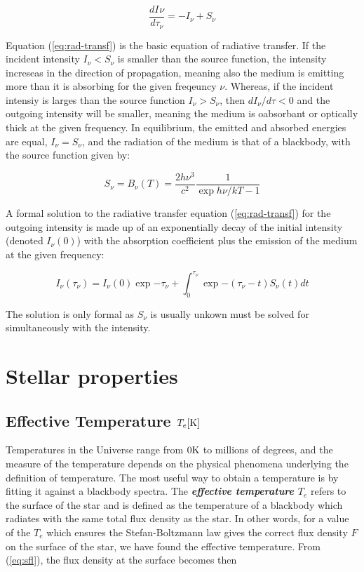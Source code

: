 \begin{equation}\label{eq:rad-transf}
	\frac{dI_{}\nu}{d\tau_{\nu}} = -I_{\nu} + S_{\nu}
\end{equation}

Equation (\ref{eq:rad-transf}) is the basic equation of radiative transfer. If the incident intensity $I_{\nu} < S_{\nu}$ is smaller than the source function, the intensity increseas in the direction of propagation, meaning also the medium is emitting more than it is absorbing for the given freqeuncy $\nu$. Whereas, if the incident intensiy is larges than the source function $I_{\nu} > S_{\nu}$, then $dI_{\nu}/d\tau < 0$ and the outgoing intensity will be smaller, meaning the medium is oabsorbant or optically thick at the given frequency. In equilibrium, the emitted and absorbed energies are equal, $I_{\nu} = S_{\nu}$, and the radiation of the medium is that of a blackbody, with the source function given by:

\begin{equation}
	S_{\nu} = B_{\nu}(T) = \frac{2h\nu^3}{c^2} \frac{1}{\exp{h\nu/kT}-1}
\end{equation}

A formal solution to the radiative transfer equation (\ref{eq:rad-transf}) for the outgoing intensity is made up of an exponentially decay of the initial intensity (denoted $I_{\nu}(0)$) with the absorption coefficient plus the emission of the medium at the given frequency:

\begin{equation}\label{eq:solution}
	I_{\nu}(\tau_{\nu}) = I_{\nu}(0)\exp{-\tau_{\nu}} + \int_0^{\tau_{\nu}} \exp{-(\tau_{\nu}-t)} S_{\nu}(t) dt
\end{equation}

The solution is only formal as $S_{\nu}$ is usually unkown must be solved for simultaneously with the intensity.

\section{Stellar properties}

\subsection{Effective Temperature $T_e [\rm{K}]$}

Temperatures in the Universe range from $\rm{0 K}$ to millions of degrees, and the measure of the temperature depends on the physical phenomena underlying the definition of temperature. The most useful way to obtain a temperature is by fitting it against a blackbody spectra. The \textbf{\textit{effective temperature $T_e$}} refers to the surface of the star and is defined as the temperature of a blackbody which radiates with the same total flux density as the star. In other words, for a value of the $T_e$ which ensures the Stefan-Boltzmann law gives the correct flux density $F$ on the surface of the star, we have found the effective temperature. From (\ref{eq:sfl}), the flux density at the surface  becomes then

